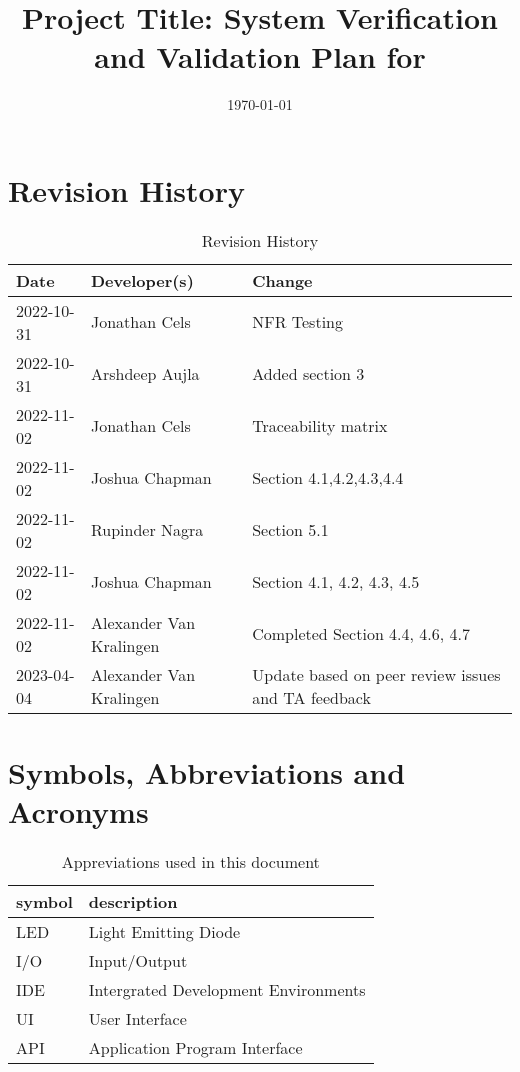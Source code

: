 \documentclass[12pt, titlepage]{article}
\begin{document}
\title{Project Title: System Verification and Validation Plan for \progname{}} 
\author{\authname}
\date{\today}
	
\maketitle


\section{Revision History}

\begin{table}[hp]
\caption{Revision History} \label{TblRevisionHistory}
\begin{tabularx}{\textwidth}{llX}
\toprule
\textbf{Date} & \textbf{Developer(s)} & \textbf{Change}\\
\midrule
2022-10-31 & Jonathan Cels & NFR Testing\\
2022-10-31 & Arshdeep Aujla & Added section 3\\
2022-11-02 & Jonathan Cels & Traceability matrix\\
2022-11-02 & Joshua Chapman & Section 4.1,4.2,4.3,4.4\\
2022-11-02 & Rupinder Nagra & Section 5.1\\
2022-11-02 & Joshua Chapman & Section 4.1, 4.2, 4.3, 4.5\\
2022-11-02 & Alexander Van Kralingen & Completed Section 4.4, 4.6, 4.7\\
2023-04-04 & Alexander Van Kralingen & Update based on peer review issues and TA feedback\\
\bottomrule
\end{tabularx}
\end{table}

\newpage

\tableofcontents

\newpage

\section{Symbols, Abbreviations and Acronyms}

\renewcommand{\arraystretch}{1.2}
\begin{table}[hp]
  \caption{Appreviations used in this document}
  \begin{tabular}{l l} 
    \toprule		
    \textbf{symbol} & \textbf{description}\\
    \midrule 
    LED & Light Emitting Diode\\
    I/O & Input/Output\\
    IDE & Intergrated Development Environments\\
    UI & User Interface\\
    API & Application Program Interface\\
    \bottomrule
  \end{tabular}\\
\end{table}
\end{document}

